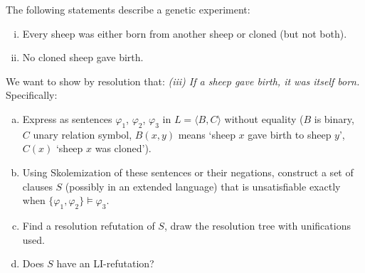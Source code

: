 \begin{problem}

    The following statements describe a genetic experiment:
    \begin{enumerate}[(i)]\it
        \item Every sheep was either born from another sheep or cloned (but not both).
        \item No cloned sheep gave birth.
    \end{enumerate}
    We want to show by resolution that: {\it (iii) If a sheep gave birth, it was itself born.} Specifically:
    \begin{enumerate}[(a)]
        \item Express as sentences $\varphi_1$, $\varphi_2$, $\varphi_3$ in $L=\langle B,C\rangle$ without equality ($B$ is binary, $C$ unary relation symbol, $B(x,y)$ means `sheep $x$ gave birth to sheep $y$', $C(x)$ `sheep $x$ was cloned').
        \item Using Skolemization of these sentences or their negations, construct a set of clauses $S$ (possibly in an extended language) that is unsatisfiable exactly when $\{\varphi_1, \varphi_2\} \models \varphi_3$.
        \item Find a resolution refutation of $S$, draw the resolution tree with unifications used.
        \item Does $S$ have an LI-refutation?
    \end{enumerate}


\end{problem}
